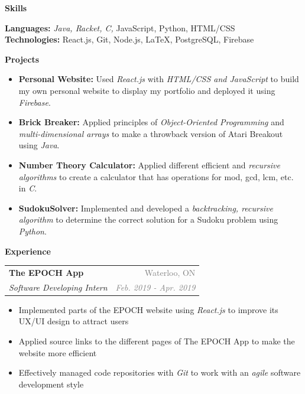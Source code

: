 \documentclass[letterpaper,11pt]{article}
\makeatletter
\newcommand{\resheading}[1]{{\large \colorbox{LightMidnightBlue}{\begin{minipage}{\textwidth}{\textbf{\textrm{#1 \vphantom{p\^{E}}}}}\end{minipage}}}}
\newcommand{\ressubheading}[4]{
\begin{tabular*}{7in}{l@{\extracolsep{\fill}}r}
        \textbf{#1} & \textcolor{gray}{#2} \\
        \textit{#3} & \textcolor{gray}{\textit{#4}} \\
\end{tabular*}\vspace{-6pt}}
\makeatother
\begin{document}
\sffamily

\hline

\vspace{2.5mm}

\resheading{Skills}

\vspace{2mm}

\textbf{Languages:} \textit{Java, Racket, C,} JavaScript, Python, HTML/CSS \\
\vspace{1.75mm}
\textbf{Technologies:} React.js, Git, Node.js, \LaTeX, PostgreSQL, Firebase

\vspace{2mm}

\resheading{Projects}

\begin{itemize}
    \setlength\itemsep{0.5mm}
    \item \textbf{Personal Website:} Used \textit{React.js} with \textit{HTML/CSS and JavaScript} to build my own personal website to display my portfolio and deployed it using \textit{Firebase}.
    \item \textbf{Brick Breaker:} Applied principles of \textit{Object-Oriented Programming} and \textit{multi-dimensional arrays} to make a throwback version of Atari Breakout using \textit{Java}.
    \item \textbf{Number Theory Calculator:} Applied different efficient and \textit{recursive algorithms} to create a calculator that has operations for mod, gcd, lcm, etc. in \textit{C}.
    \item \textbf{SudokuSolver:} Implemented and developed a \textit{backtracking, recursive algorithm} to determine the correct solution for a Sudoku problem using \textit{Python}.
\end{itemize}

\resheading{Experience}

\vspace{2mm}

    \ressubheading{The EPOCH App}{Waterloo, ON}{Software Developing Intern}{Feb. 2019 - Apr. 2019}
        \begin{itemize}
        \setlength\itemsep{0.75mm}
            \item Implemented parts of the EPOCH website using \textit{React.js} to improve its UX/UI design to attract users
            \item Applied source links to the different pages of The EPOCH App to make the website more efficient
            \item Effectively managed code repositories with \textit{Git} to work with an \textit{agile} software development style
        \end{itemize}
\end{document}
